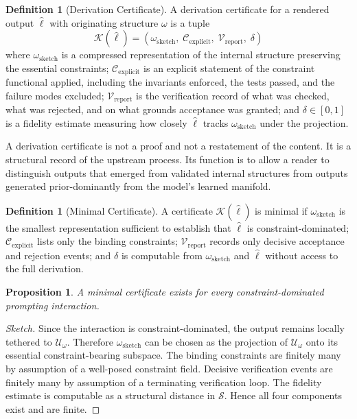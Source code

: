 \documentclass[12pt, a4paper]{article}
\theoremstyle{plain}
\newtheorem{proposition}[theorem]{Proposition}
\theoremstyle{definition}
\newtheorem{definition}[theorem]{Definition}
\theoremstyle{remark}
\begin{document}
\begin{definition}[Derivation Certificate]
A derivation certificate for a rendered output $\hat{\ell}$ with originating structure $\omega$ is a tuple
\[
\mathcal{K}(\hat{\ell}) = (\omega_{\mathrm{sketch}},\; \mathcal{C}_{\mathrm{explicit}},\; \mathcal{V}_{\mathrm{report}},\; \delta)
\]
where $\omega_{\mathrm{sketch}}$ is a compressed representation of the internal structure preserving the essential constraints; $\mathcal{C}_{\mathrm{explicit}}$ is an explicit statement of the constraint functional applied, including the invariants enforced, the tests passed, and the failure modes excluded; $\mathcal{V}_{\mathrm{report}}$ is the verification record of what was checked, what was rejected, and on what grounds acceptance was granted; and $\delta \in [0,1]$ is a fidelity estimate measuring how closely $\hat{\ell}$ tracks $\omega_{\mathrm{sketch}}$ under the projection.
\end{definition}

A derivation certificate is not a proof and not a restatement of the content. It is a structural record of the upstream process. Its function is to allow a reader to distinguish outputs that emerged from validated internal structures from outputs generated prior-dominantly from the model's learned manifold.

\begin{definition}[Minimal Certificate]
A certificate $\mathcal{K}(\hat{\ell})$ is minimal if $\omega_{\mathrm{sketch}}$ is the smallest representation sufficient to establish that $\hat{\ell}$ is constraint-dominated; $\mathcal{C}_{\mathrm{explicit}}$ lists only the binding constraints; $\mathcal{V}_{\mathrm{report}}$ records only decisive acceptance and rejection events; and $\delta$ is computable from $\omega_{\mathrm{sketch}}$ and $\hat{\ell}$ without access to the full derivation.
\end{definition}

\begin{proposition}
A minimal certificate exists for every constraint-dominated prompting interaction.
\end{proposition}

\begin{proof}[Sketch]
Since the interaction is constraint-dominated, the output remains locally tethered to $\mathcal{U}_\omega$. Therefore $\omega_{\mathrm{sketch}}$ can be chosen as the projection of $\mathcal{U}_\omega$ onto its essential constraint-bearing subspace. The binding constraints are finitely many by assumption of a well-posed constraint field. Decisive verification events are finitely many by assumption of a terminating verification loop. The fidelity estimate is computable as a structural distance in $\mathcal{S}$. Hence all four components exist and are finite.
\end{proof}
\end{document}
